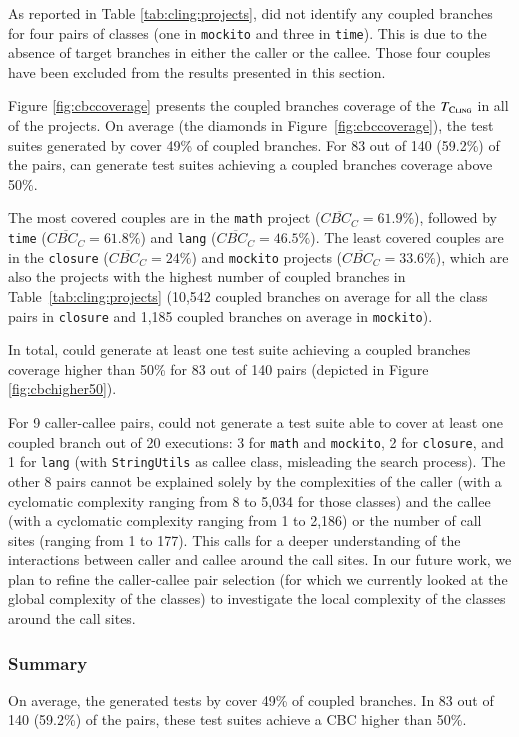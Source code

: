 As reported in Table \ref{tab:cling:projects}, \cling did not identify any coupled branches for four pairs of classes (one in \texttt{mockito} and three in \texttt{time}). This is due to the absence of target branches in either the caller or the callee. 
Those four couples have been excluded from the results presented in this section.

Figure \ref{fig:cbccoverage} presents the coupled branches coverage of the $T_{\textsc{Cling}}$ in all of the projects. On average (the diamonds in Figure~\ref{fig:cbccoverage}), the test suites generated by \cling cover 49\% of coupled branches.
For 83 out of 140 (59.2\%) of the pairs, \cling can generate test suites achieving a coupled branches coverage above 50\%. 

The most covered couples are in the \texttt{math} project ($\overline{CBC_C}=61.9\%$), followed by \texttt{time} ($\overline{CBC_C}=61.8\%$) and \texttt{lang} ($\overline{CBC_C}=46.5\%$). The least covered couples are in the \texttt{closure} ($\overline{CBC_C}=24\%$)  and \texttt{mockito} projects ($\overline{CBC_C}=33.6\%$), which are also the projects with the highest number of coupled branches in Table~\ref{tab:cling:projects} (10,542 coupled branches on average for all the class pairs in \texttt{closure} and 1,185 coupled branches on average in \texttt{mockito}).

In total, \cling could generate at least one test suite achieving a coupled branches coverage higher than 50\% for 83 out of 140 pairs (depicted in Figure \ref{fig:cbchigher50}).

For 9 caller-callee pairs, \cling could not generate a test suite able to cover at least one coupled branch out of 20 executions: 3 for \texttt{math} and \texttt{mockito}, 2 for \texttt{closure}, and 1 for \texttt{lang} (with \texttt{StringUtils} as callee class, misleading the search process). The other 8 pairs cannot be explained solely by the complexities of the caller (with a cyclomatic complexity ranging from 8 to 5,034 for those classes) and the callee (with a cyclomatic complexity ranging from 1 to 2,186) or the number of call sites (ranging from 1 to 177). This calls for a deeper understanding of the interactions between caller and callee around the call sites. In our future work, we plan to refine the caller-callee pair selection (for which we currently looked at the global complexity of the classes) to investigate the local complexity of the classes around the call sites.

\subsubsection{Summary}
On average, the generated tests by \cling cover 49\% of coupled branches.
In  83 out of 140 (59.2\%) of the pairs, these test suites achieve a CBC higher than 50\%.
